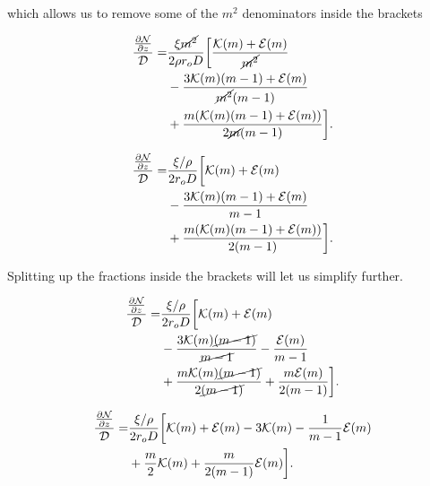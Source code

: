 \noindent which allows us to remove some of the \(m^2\) denominators inside the brackets

\begin{equation}
    \begin{split}
        \frac{\frac{\partial \mathcal{N}}{\partial z}}{\mathcal{D}} =& \frac{\xi\cancel{m^2}}{2\rho r_o D} \bigg[ \frac{\mathcal{K}(m)+\mathcal{E}(m)}{\cancel{m^2}}\\
         &- \frac{3\mathcal{K}(m)(m-1)+\mathcal{E}(m)}{\cancel{m^2}(m-1)}\\
         &+ \frac{m(\mathcal{K}(m)(m-1)+\mathcal{E}(m))}{2\cancel{m}(m-1)} \bigg].
    \end{split}
\end{equation}

\begin{equation}
    \begin{split}
        \frac{\frac{\partial \mathcal{N}}{\partial z}}{\mathcal{D}} =& \frac{\xi/\rho}{2r_o D} \bigg[ \mathcal{K}(m)+\mathcal{E}(m)\\
         &- \frac{3\mathcal{K}(m)(m-1)+\mathcal{E}(m)}{m-1}\\
         &+ \frac{m(\mathcal{K}(m)(m-1)+\mathcal{E}(m))}{2(m-1)} \bigg].
    \end{split}
\end{equation}

\noindent Splitting up the fractions inside the brackets will let us simplify further.

\begin{equation}
    \begin{split}
        \frac{\frac{\partial \mathcal{N}}{\partial z}}{\mathcal{D}} =& \frac{\xi/\rho}{2r_o D} \bigg[ \mathcal{K}(m)+\mathcal{E}(m)\\
         &- \frac{3\mathcal{K}(m)\cancel{(m-1)}}{\cancel{m-1}} - \frac{\mathcal{E}(m)}{m-1}\\
         &+ \frac{m\mathcal{K}(m)\cancel{(m-1)}}{2\cancel{(m-1)}} + \frac{m\mathcal{E}(m)}{2(m-1)} \bigg].
\end{split}
\end{equation}

\begin{equation}
    \begin{split}
        \frac{\frac{\partial \mathcal{N}}{\partial z}}{\mathcal{D}} =& \frac{\xi/\rho}{2r_o D} \bigg[ \mathcal{K}(m)+\mathcal{E}(m) - 3\mathcal{K}(m) - \frac{1}{m-1}\mathcal{E}(m)\\
         &+ \frac{m}{2}\mathcal{K}(m) + \frac{m}{2(m-1)} \mathcal{E}(m) \bigg].
\end{split}
\end{equation}

